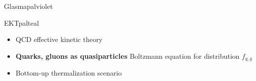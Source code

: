 \documentclass[aspectratio=169,11pt,usenames,dvipsnames]{beamer}
\begin{document}
\begin{frame}[noframenumbering]
\begin{columns}[onlytextwidth,t]
\begin{center}
\begin{custombox2}{Glasma}{palviolet}
\begin{varwidth}{0.72\textwidth}
\begin{itemize}
                \end{itemize}
                \end{varwidth}
            \end{custombox2}
            \begin{custombox2}{EKT}{palteal}
                \small
                \begin{varwidth}{0.9\textwidth}
                \begin{itemize}\itemsep0em 
                    \item QCD effective kinetic theory
                    \item {\bfseries Quarks, gluons as quasiparticles}
                        {\color{lightgray}\scriptsize Boltzmann equation for distribution $f_{q,g}$}
                    \item Bottom-up thermalization scenario
                    

\end{itemize}
\end{varwidth}
\end{custombox2}
\end{center}
\end{columns}
\end{frame}
\end{document}
